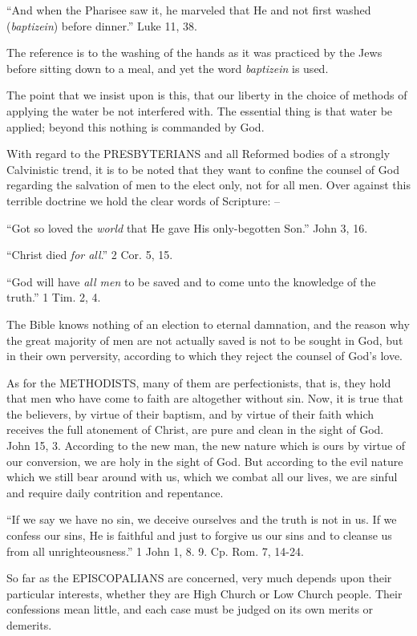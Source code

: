\documentclass[
]{book}
\begin{document}
``And when the Pharisee saw it, he marveled that He and not first washed (\emph{baptizein}) before dinner.'' Luke 11, 38.

The reference is to the washing of the hands as it was practiced by the Jews before sitting down to a meal, and yet the word \emph{baptizein} is used.

The point that we insist upon is this, that our liberty in the choice of methods of applying the water be not interfered with. The essential thing is that water be applied; beyond this nothing is commanded by God.

With regard to the PRESBYTERIANS and all Reformed bodies of a strongly Calvinistic trend, it is to be noted that they want to confine the counsel of God regarding the salvation of men to the elect only, not for all men. Over against this terrible doctrine we hold the clear words of Scripture: --

``Got so loved the \emph{world} that He gave His only-begotten Son.'' John 3, 16.

``Christ died \emph{for all}.'' 2 Cor. 5, 15.

``God will have \emph{all men} to be saved and to come unto the knowledge of the truth.'' 1 Tim. 2, 4.

The Bible knows nothing of an election to eternal damnation, and the reason why the great majority of men are not actually saved is not to be sought in God, but in their own perversity, according to which they reject the counsel of God's love.

As for the METHODISTS, many of them are perfectionists, that is, they hold that men who have come to faith are altogether without sin. Now, it is true that the believers, by virtue of their baptism, and by virtue of their faith which receives the full atonement of Christ, are pure and clean in the sight of God. John 15, 3. According to the new man, the new nature which is ours by virtue of our conversion, we are holy in the sight of God. But according to the evil nature which we still bear around with us, which we combat all our lives, we are sinful and require daily contrition and repentance.

``If we say we have no sin, we deceive ourselves and the truth is not in us. If we confess our sins, He is faithful and just to forgive us our sins and to cleanse us from all unrighteousness.'' 1 John 1, 8. 9. Cp. Rom. 7, 14-24.

So far as the EPISCOPALIANS are concerned, very much depends upon their particular interests, whether they are High Church or Low Church people. Their confessions mean little, and each case must be judged on its own merits or demerits.
\end{document}
